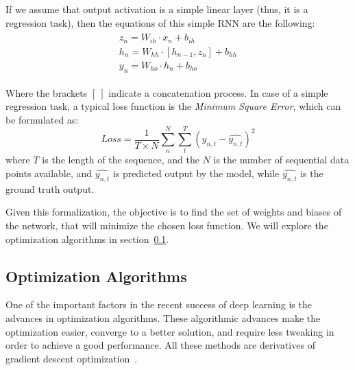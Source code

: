 \par If we assume that output activation is a simple linear layer (thus, it is a regression task), then the equations of this simple RNN are the following:
\begin{align}
    \begin{split}
    z_n = W_{ih} \cdot x_{n} + b_{ih}
    \\
    h_n = W_{hh} \cdot [h_{n-1}, z_{n}] + b_{hh}
    \\
    y_n = W_{ho} \cdot h_{n} + b_{ho}
    \label{eq:rnn_equations}
    \end{split}
\end{align}

\par Where the brackets $[\ ]$ indicate a concatenation process. In case of a simple regression task, a typical loss function is the \textit{Minimum Square Error}, which can be formulated as:
\begin{equation}
    Loss = \frac{1}{T \times N} \sum_{n}^{N} \sum_{t}^{T} \left ( y_{n, t} - \hat{y_{n, t}}\right )^2
    \label{eq:loss_fn_mse}
\end{equation}
where $T$ is the length of the sequence, and the $N$ is the number of sequential data points available, and $\hat{y_{n, t}}$ is predicted output by the model, while $\hat{y_{n, t}}$ is the ground truth output.

\par Given this formalization, the objective is to find the set of weights and biases of the network, that will minimize the chosen loss function. We will explore the optimization algorithms in section~\ref{subsec:optimization}.

\subsection{Optimization Algorithms} \label{subsec:optimization}
\par One of the important factors in the recent success of deep learning is the advances in optimization algorithms. These algorithmic advances make the optimization easier, converge to a better solution, and require less tweaking in order to achieve a good performance. All these methods are derivatives of gradient descent optimization~\citep{boyd2004convex}.
%

